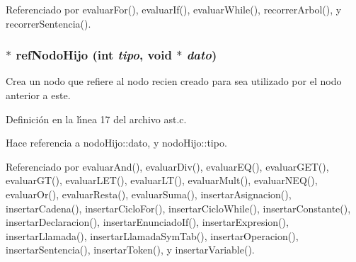 Referenciado por evaluar\-For(), evaluar\-If(), evaluar\-While(), recorrer\-Arbol(), y recorrer\-Sentencia().
\subsubsection{$\ast$ ref\-Nodo\-Hijo (int {\em tipo}, void $\ast$ {\em dato})}\label{ast_8h_a34}


Crea un nodo que refiere al nodo recien creado para sea utilizado por el nodo anterior a este. 



Definici\'{o}n en la l\'{\i}nea 17 del archivo ast.c.

Hace referencia a nodo\-Hijo::dato, y nodo\-Hijo::tipo.

Referenciado por evaluar\-And(), evaluar\-Div(), evaluar\-EQ(), evaluar\-GET(), evaluar\-GT(), evaluar\-LET(), evaluar\-LT(), evaluar\-Mult(), evaluar\-NEQ(), evaluar\-Or(), evaluar\-Resta(), evaluar\-Suma(), insertar\-Asignacion(), insertar\-Cadena(), insertar\-Ciclo\-For(), insertar\-Ciclo\-While(), insertar\-Constante(), insertar\-Declaracion(), insertar\-Enunciado\-If(), insertar\-Expresion(), insertar\-Llamada(), insertar\-Llamada\-Sym\-Tab(), insertar\-Operacion(), insertar\-Sentencia(), insertar\-Token(), y insertar\-Variable().